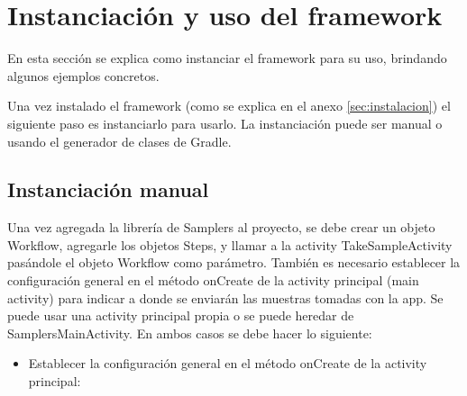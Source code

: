 \chapter{Instanciación  y uso del framework} \label{sec:instanciacion}
En esta sección se explica como instanciar el framework para su uso, brindando algunos ejemplos concretos.

Una vez instalado el framework (como se explica en el anexo \ref{sec:instalacion}) el siguiente paso es instanciarlo para usarlo. La instanciación puede ser manual o usando el generador de clases de Gradle.


\section{Instanciación manual} \label{sec:instanciacion_manual}
Una vez agregada la librería de Samplers al proyecto, se debe crear un objeto Workflow, agregarle los objetos Steps, y llamar a la activity TakeSampleActivity pasándole el objeto Workflow como parámetro.
También es necesario establecer la configuración general en el método onCreate de la activity principal (main activity) para indicar a donde se enviarán las muestras tomadas con la app.
Se puede usar una activity principal propia o se puede heredar de SamplersMainActivity. En ambos casos se debe hacer lo siguiente:
\begin{itemize}
	\item Establecer la configuración general en el método onCreate de la activity principal:
\end{itemize}
	

\clearpage

